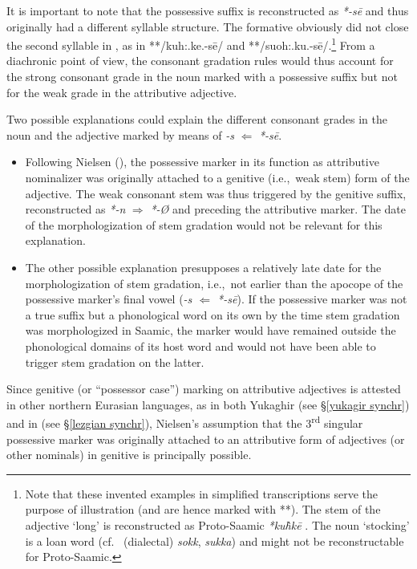 {It is important to note that the possessive suffix is reconstructed as  \textit{*-sē} \cite[73]{sammallahti1998b} and thus originally had a different syllable structure. The formative obviously did not close the second syllable in , as in **/kuh:.ke.-sē/ and **/suoh:.ku.-sē/.\footnote{Note that these invented examples in simplified transcriptions serve the purpose of illustration (and are hence marked with **). The stem of the adjective ‘long’ is reconstructed as Proto\hyp{}Saamic \textit{*ku\`{h}kē} \cite[246]{sammallahti1998b}. The noun ‘stocking’ is a loan word (cf.~ (dialectal) \textit{sokk},  \textit{sukka}) and might not be reconstructable for Proto\hyp{}Saamic.} From a diachronic point of view, the consonant gradation rules would thus account for the strong consonant grade in the noun marked with a possessive suffix but not for the weak grade in the attributive adjective.
 
Two possible explanations could explain the different consonant grades in the noun and the adjective marked by means of \textit{-s} $\Leftarrow$ \textit{*-sē}.
\begin{itemize}
\item Following Nielsen (\citeyear{nielsen1945b}), the possessive marker in its function as attributive nominalizer was originally attached to a genitive (i.e.,~weak stem) form of the adjective. The weak consonant stem was thus triggered by the genitive suffix, reconstructed as  \textit{*-n} $\Rightarrow$  \mbox{\textit{*-Ø}} \cite[65]{sammallahti1998b} and preceding the attributive marker. The date of the morphologization of stem gradation would not be relevant for this explanation.
\item The other possible explanation presupposes a relatively late date for the morphologization of stem gradation, i.e.,~not earlier than the apocope of the possessive marker's final vowel (\textit{-s $\Leftarrow$ *-sē}). If the possessive marker was not a true suffix but a phonological word on its own by the time stem gradation was morphologized in Saamic, the marker would have remained outside the phonological domains of its host word and would not have been able to trigger stem gradation on the latter. 
\end{itemize}
Since genitive (or “possessor case”) marking on attributive adjectives is attested in other northern Eurasian languages, as in both Yukaghir (see \S\ref{yukagir synchr}) and in  (see \S\ref{lezgian synchr}), Nielsen's assumption that the 3\textsuperscript{rd} singular possessive marker was originally attached to an attributive form of adjectives (or other nominals) in genitive is principally possible.

}
